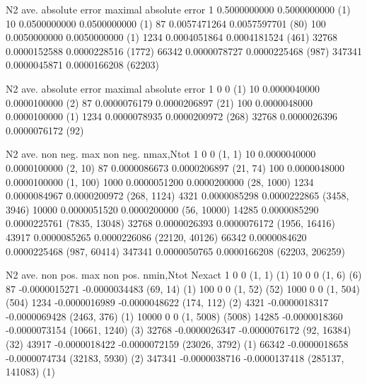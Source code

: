 \bye


N2      ave. absolute error maximal absolute error
1       0.5000000000        0.5000000000 (1)
10      0.0500000000        0.0500000000 (1)
87      0.0057471264        0.0057597701 (80)
100     0.0050000000        0.0050000000 (1)
1234    0.0004051864        0.0004181524 (461)
32768   0.0000152588        0.0000228516 (1772)
66342   0.0000078727        0.0000225468 (987)
347341  0.0000045871        0.0000166208 (62203)


N2      ave. absolute error maximal absolute error
1       0                   0            (1)
10      0.0000040000        0.0000100000 (2)
87      0.0000076179        0.0000206897 (21)
100     0.0000048000        0.0000100000 (1)
1234    0.0000078935        0.0000200972 (268)
32768   0.0000026396        0.0000076172 (92)           


N2     ave. non neg.   max non neg. nmax,Ntot      
1      0               0            (1, 1)          
10     0.0000040000    0.0000100000 (2, 10)         
87     0.0000086673    0.0000206897 (21, 74)        
100    0.0000048000    0.0000100000 (1, 100)        
1000   0.0000051200    0.0000200000 (28, 1000)      
1234   0.0000084967    0.0000200972 (268, 1124)     
4321   0.0000085298    0.0000222865 (3458, 3946)    
10000  0.0000051520    0.0000200000 (56, 10000)     
14285  0.0000085290    0.0000225761 (7835, 13048)   
32768  0.0000026393    0.0000076172 (1956, 16416)   
43917  0.0000085265    0.0000226086 (22120, 40126)  
66342  0.0000084620    0.0000225468 (987, 60414)    
347341 0.0000050765    0.0000166208 (62203, 206259)  

N2      ave. non pos.  max non pos.  nmin,Ntot    Nexact    
1       0              0            (1, 1)           (1)   
10      0              0            (1, 6)           (6)   
87     -0.0000015271  -0.0000034483 (69, 14)         (1)   
100     0              0            (1, 52)          (52)  
1000    0              0            (1, 504)         (504) 
1234   -0.0000016989  -0.0000048622 (174, 112)       (2)   
4321   -0.0000018317  -0.0000069428 (2463, 376)      (1)   
10000   0              0            (1, 5008)        (5008)
14285  -0.0000018360  -0.0000073154 (10661, 1240)    (3)   
32768  -0.0000026347  -0.0000076172 (92, 16384)      (32)  
43917  -0.0000018422  -0.0000072159 (23026, 3792)    (1)   
66342  -0.0000018658  -0.0000074734 (32183, 5930)    (2)   
347341 -0.0000038716  -0.0000137418 (285137, 141083) (1)   